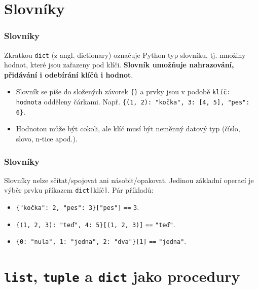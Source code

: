 \documentclass[aspectratio=169,11pt]{beamer}
\begin{document}
\section[Slovníky]{Slovníky}

\begin{frame}[plain]
 \sectionpage
\end{frame}

\begin{frame}
 \frametitle{Slovníky}
 \begin{tcolorbox}[title=Datový typ \texttt{dict}]
  Zkratkou \texttt{\alert{dict}} (z angl. \alert{dict}ionary) označuje Python
  typ slovníku, tj. množiny hodnot, které jsou zařazeny pod klíči.
  \textbf{Slovník umožňuje nahrazování, přidávání i odebírání klíčů i hodnot}.
 \end{tcolorbox}
 \begin{itemize}
  \item<2-> Slovník se píše do složených závorek \texttt{\{\}} a prvky jsou v
   podobě \texttt{klíč: hodnota} odděleny čárkami. Např. \texttt{\{(1, 2):
   "kočka", 3: [4, 5], "pes": 6\}}.
  \item<3-> Hodnotou může být cokoli, ale klíč musí být \alert{neměnný datový
   typ} (číslo, slovo, n-tice apod.).
 \end{itemize}
\end{frame}

\begin{frame}
 \frametitle{Slovníky}
 Slovníky nelze sčítat/spojovat ani násobit/opakovat. Jedinou základní operací
 je výběr prvku příkazem \texttt{dict[}klíč\texttt{]}. Pár příkladů:
 \begin{itemize}
  \item<2-> \texttt{\{"kočka": 2, "pes": 3\}["pes"]} \texttt{==} \texttt{3}.
  \item<3-> \texttt{\{(1, 2, 3): "teď", 4: 5\}[(1, 2, 3)]} \texttt{==}
   \texttt{"teď"}.
  \item<4-> \texttt{\{0: "nula", 1: "jedna", 2: "dva"\}[1]} \texttt{==}
   \texttt{"jedna"}.
 \end{itemize}
\end{frame}

\section[\texttt{list}, \texttt{tuple} a \texttt{dict} jako
procedury]{\texttt{list}, \texttt{tuple} a \texttt{dict} jako procedury}

\begin{frame}[plain]
 \sectionpage
\end{frame}
\end{document}
